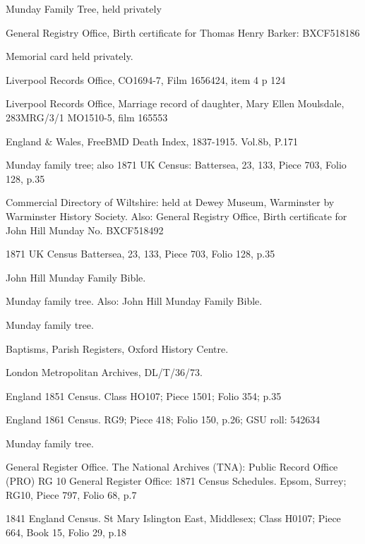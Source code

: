 \begin{thebibliography}{99}
	Munday Family Tree, held privately

	 General Registry Office, Birth certificate for Thomas Henry Barker: BXCF518186

	 Memorial card held privately.

	Liverpool Records Office, CO1694-7, Film 1656424, item 4 p 124

	Liverpool Records Office, Marriage record of daughter, Mary Ellen Moulsdale, 283MRG/3/1 MO1510-5, film 165553

	England \& Wales, FreeBMD Death Index, 1837-1915. Vol.8b, P.171

	Munday family tree; also
	1871 UK Census: Battersea, 23, 133, Piece 703, Folio 128, p.35

	Commercial Directory of Wiltshire: held at Dewey Museum, Warminster by Warminster History Society.
	Also: General Registry Office, Birth certificate for John Hill Munday No. BXCF518492

	1871 UK Census
	Battersea, 23, 133, Piece 703, Folio 128, p.35

	John Hill Munday Family Bible.

	Munday family tree. Also:
	John Hill Munday Family Bible.

	Munday family tree.

	 Baptisms, Parish Registers, Oxford History Centre.

	 London Metropolitan Archives, DL/T/36/73.

	England 1851 Census.
	Class HO107; Piece 1501; Folio 354; p.35

	England 1861 Census.
	RG9; Piece 418; Folio 150, p.26; GSU roll: 542634

	Munday family tree.

	General Register Office. The National Archives (TNA): Public Record Office (PRO) RG 10 General Register Office: 1871 Census Schedules.
	Epsom, Surrey; RG10, Piece 797, Folio 68, p.7

	1841 England Census.
	St Mary Islington East, Middlesex; Class H0107; Piece 664, Book 15, Folio 29, p.18


\end{thebibliography}
